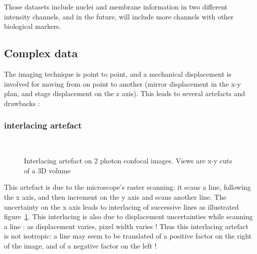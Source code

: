 Those datasets include nuclei and membrane information in two different intensity channels, and in the future, will include more channels with other biological markers. 


\subsection{Complex data}

The imaging technique is point to point, and a mechanical displacement is involved for moving from on point to another (mirror displacement in the x-y plan, and stage displacement on the z axis). This leads to several artefacts and drawbacks :

\subsubsection{interlacing artefact}
\begin{figure}[htb]
  \centering
  \\
  \caption{Interlacing artefact on 2 photon confocal images. Views are x-y cuts of a 3D volume}
  \label{fig:InterlacingArtefact}
\end{figure}
This artefact is due to the microscope's raster scanning: it scans a line, following the x axis, and then increment on the y axis and scans another line.
The uncertainty on the x axis leads to interlacing of successive lines as illustrated figure~\ref{fig:InterlacingArtefact}.
This interlacing is also due to displacement uncertainties while scanning a line : as displacement varies, pixel width varies !
Thus this interlacing artefact is not isotropic: a line may seem to be translated of a positive factor on the right of the image, and of a negative factor on the left !


